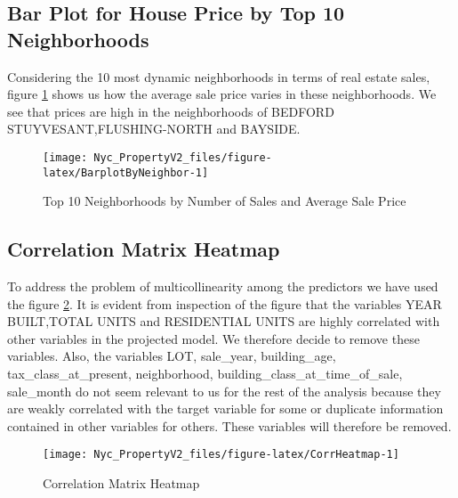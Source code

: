 \documentclass[
]{article}
\begin{document}
\subsection{Bar Plot for House Price by Top 10 Neighborhoods}\label{bar-plot-for-house-price-by-top-10-neighborhoods}

Considering the 10 most dynamic neighborhoods in terms of real estate sales, figure \ref{fig:BarplotByNeighbor} shows us how the average sale price varies in these neighborhoods. We see that prices are high in the neighborhoods of BEDFORD STUYVESANT,FLUSHING-NORTH and BAYSIDE.

\begin{figure}[H]

{\centering \texttt{[image: Nyc\_PropertyV2\_files/figure-latex/BarplotByNeighbor-1]} 

}

\caption{Top 10 Neighborhoods by Number of Sales and Average Sale Price}\label{fig:BarplotByNeighbor}
\end{figure}

\subsection{Correlation Matrix Heatmap}\label{correlation-matrix-heatmap}

To address the problem of multicollinearity among the predictors we have used the figure \ref{fig:CorrHeatmap}. It is evident from inspection of the figure that the variables YEAR BUILT,TOTAL UNITS and RESIDENTIAL UNITS are highly correlated with other variables in the projected model. We therefore decide to remove these variables. Also, the variables LOT, sale\_year, building\_age, tax\_class\_at\_present, neighborhood, building\_class\_at\_time\_of\_sale, sale\_month do not seem relevant to us for the rest of the analysis because they are weakly correlated with the target variable for some or duplicate information contained in other variables for others. These variables will therefore be removed.

\begin{figure}[H]

{\centering \texttt{[image: Nyc\_PropertyV2\_files/figure-latex/CorrHeatmap-1]} 

}

\caption{Correlation Matrix Heatmap}\label{fig:CorrHeatmap}
\end{figure}

\newpage
\end{document}

